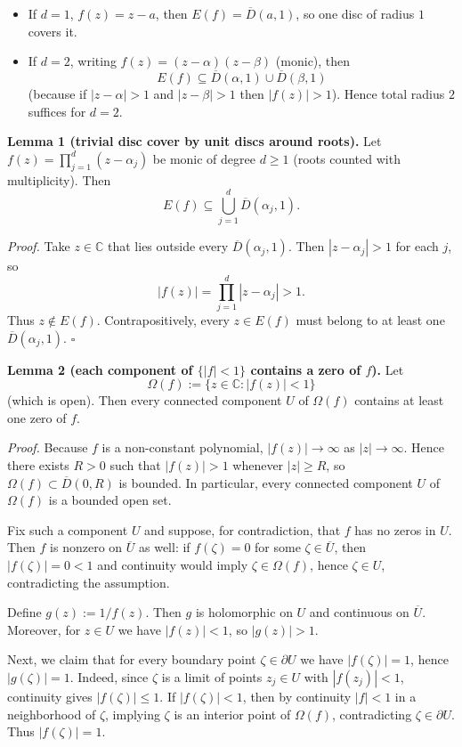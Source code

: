 \begin{itemize}
\item If $d=1$, $f(z)=z-a$, then $E(f)=\overline{D}(a,1)$, so one disc of radius $1$ covers it.
\item If $d=2$, writing $f(z)=(z-\alpha)(z-\beta)$ (monic), then
\[
E(f)\subseteq \overline{D}(\alpha,1)\cup \overline{D}(\beta,1)
\]
(because if $|z-\alpha|>1$ and $|z-\beta|>1$ then $|f(z)|>1$). Hence total radius $2$ suffices for $d=2$.
\end{itemize}

\medskip
\noindent\textbf{Lemma 1 (trivial disc cover by unit discs around roots).}
Let $f(z)=\prod_{j=1}^d (z-\alpha_j)$ be monic of degree $d\ge 1$ (roots counted with multiplicity). Then
\[
E(f)\subseteq \bigcup_{j=1}^d \overline{D}(\alpha_j,1).
\]

\textit{Proof.}
Take $z\in\mathbb{C}$ that lies outside every $\overline{D}(\alpha_j,1)$. Then $|z-\alpha_j|>1$ for each $j$, so
\[
|f(z)|=\prod_{j=1}^d |z-\alpha_j| > 1.
\]
Thus $z\notin E(f)$. Contrapositively, every $z\in E(f)$ must belong to at least one $\overline{D}(\alpha_j,1)$.
\hfill$\square$

\medskip
\noindent\textbf{Lemma 2 (each component of $\{|f|<1\}$ contains a zero of $f$).}
Let
\[
\Omega(f):=\{z\in\mathbb{C}: |f(z)|<1\}
\]
(which is open). Then every connected component $U$ of $\Omega(f)$ contains at least one zero of $f$.

\textit{Proof.}
Because $f$ is a non-constant polynomial, $|f(z)|\to\infty$ as $|z|\to\infty$. Hence there exists $R>0$ such that $|f(z)|>1$ whenever $|z|\ge R$, so $\Omega(f)\subset \overline{D}(0,R)$ is bounded. In particular, every connected component $U$ of $\Omega(f)$ is a bounded open set.

Fix such a component $U$ and suppose, for contradiction, that $f$ has no zeros in $U$. Then $f$ is nonzero on $\overline{U}$ as well: if $f(\zeta)=0$ for some $\zeta\in\overline{U}$, then $|f(\zeta)|=0<1$ and continuity would imply $\zeta\in\Omega(f)$, hence $\zeta\in U$, contradicting the assumption.

Define $g(z):=1/f(z)$. Then $g$ is holomorphic on $U$ and continuous on $\overline{U}$. Moreover, for $z\in U$ we have $|f(z)|<1$, so $|g(z)|>1$.

Next, we claim that for every boundary point $\zeta\in\partial U$ we have $|f(\zeta)|=1$, hence $|g(\zeta)|=1$. Indeed, since $\zeta$ is a limit of points $z_j\in U$ with $|f(z_j)|<1$, continuity gives $|f(\zeta)|\le 1$. If $|f(\zeta)|<1$, then by continuity $|f|<1$ in a neighborhood of $\zeta$, implying $\zeta$ is an interior point of $\Omega(f)$, contradicting $\zeta\in\partial U$. Thus $|f(\zeta)|=1$.

